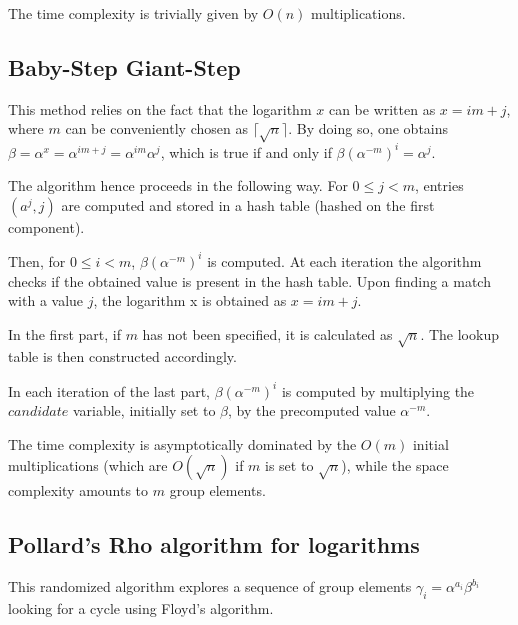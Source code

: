 \documentclass[UTF8]{article}
\begin{document}
\begin{minipage}{\linewidth}

\end{minipage}

The time complexity is trivially given by $O(n)$ multiplications.

\subsection{Baby-Step Giant-Step}

This method relies on the fact that the logarithm $x$ can be written as $x = i m + j$, where $m$ can be conveniently chosen as $\lceil \sqrt{n} \rceil$. By doing so, one obtains $\beta = \alpha^{x} = \alpha^{i m + j} = \alpha^{i m} \alpha^{j}$, which is true if and only if $\beta (\alpha^{-m})^i = \alpha^{j}$.

The algorithm hence proceeds in the following way. For $0 \leq j < m$, entries $(a^j, j)$ are computed and stored in a hash table (hashed on the first component).

Then, for $0 \leq i < m$, $\beta (\alpha^{-m})^i$ is computed. At each iteration the algorithm checks if the obtained value is present in the hash table. Upon finding a match with a value $j$, the logarithm x is obtained as $x = i m + j$.

\begin{minipage}{\linewidth}

\end{minipage}

In the first part, if $m$ has not been specified, it is calculated as $\sqrt{n}$. The lookup table is then constructed accordingly.

In each iteration of the last part, $\beta (\alpha^{-m})^i$ is computed by multiplying the $candidate$ variable, initially set to $\beta$, by the precomputed value $\alpha^{-m}$.

The time complexity is asymptotically dominated by the $O(m)$ initial multiplications (which are $O(\sqrt{n})$ if $m$ is set to $\sqrt{n}$), while the space complexity amounts to $m$ group elements.

\subsection{Pollard's Rho algorithm for logarithms}

This randomized algorithm explores a sequence of group elements $\gamma_i = \alpha^{a_i} \beta^{b_i}$ looking for a cycle using Floyd's algorithm.
\end{document}
